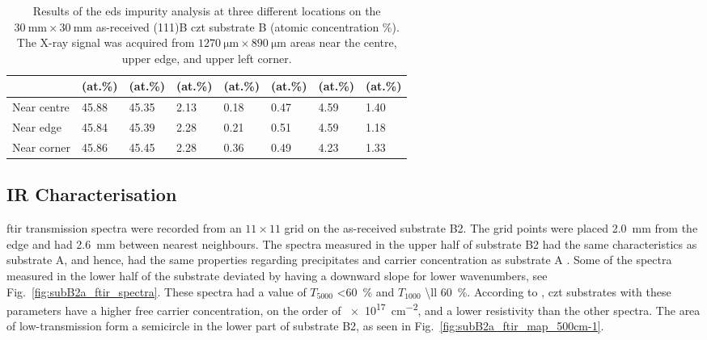 \begin{table}[htbp]
    \centering
    \caption[\Ac{eds} impurity analysis of the as-received substrate B.]{Results of the \ac{eds} impurity analysis at three different locations on the $\SI{30}{\milli\metre}\times\SI{30}{\milli\metre}$ as-received (111)B \ac{czt} substrate B (atomic concentration \%). The X-ray signal was acquired from $\SI{1270}{\micro\metre}\times\SI{890}{\micro\metre}$ areas near the centre, upper edge, and upper left corner.}\label{tab:subBa_eds_analysis}
    \begin{tabu} to 1.0\textwidth { X[1.85,r] X[1.125,c] X[1.125,c] X[1.125,c] X[1.125,c] X[1.125,c] X[1.125,c] X[1.125,c] }
    \hline
         & \textbf{} (at.\%) & \textbf{} (at.\%) & \textbf{} (at.\%) & \textbf{ } (at.\%) & \textbf{} (at.\%) & \textbf{} (at.\%) & \textbf{} (at.\%) \\ %
        \hline
        Near centre & \SI{45.88}{} & \SI{45.35}{} & \SI{2.13}{} & \SI{0.18}{} & \SI{0.47}{} & \SI{4.59}{} & \SI{1.40}{}  \\ %
        Near edge & \SI{45.84}{} & \SI{45.39}{} & \SI{2.28}{} & \SI{0.21}{} & \SI{0.51}{} & \SI{4.59}{} & \SI{1.18}{}   \\ %
        Near corner & \SI{45.86}{} & \SI{45.45}{} & \SI{2.28}{} & \SI{0.36}{} & \SI{0.49}{} & \SI{4.23}{} & \SI{1.33}{}  \\ %
         \hline
    \end{tabu}
\end{table}
\subsection{IR Characterisation}

\Ac{ftir} transmission spectra were recorded from an $11\times11$ grid on the as-received substrate B2. The grid points were placed \SI{2.0}{\milli\metre} from the edge and had \SI{2.6}{\milli\metre} between nearest neighbours. The spectra measured in the upper half of substrate B2 had the same characteristics as substrate A, and hence, had the same properties regarding precipitates and carrier concentration as substrate A \citep{yujie2004infrared}. Some of the spectra measured in the lower half of the substrate deviated by having a downward slope for lower wavenumbers, see Fig.~\ref{fig:subB2a_ftir_spectra}. These spectra had a value of $T_{5000}$ \SI{<60}{\percent} and $T_{1000}$ \SI{\ll 60}{\percent}. According to \citet{yujie2004infrared}, \ac{czt} substrates with these parameters have a higher free carrier concentration, on the order of  \SI{e17}{\centi\metre^{-2}}, and a lower resistivity than the other spectra. The area of low-transmission form a semicircle in the lower part of substrate B2, as seen in Fig.~\ref{fig:subB2a_ftir_map_500cm-1}. %


